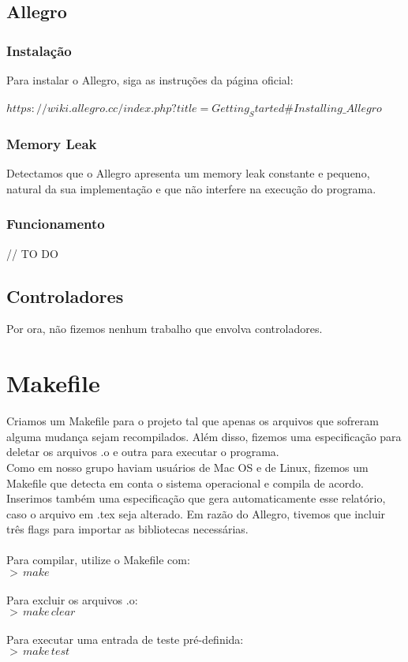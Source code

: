 \documentclass{article}
\begin{document}
\subsection{Allegro}
\subsubsection{Instalação}
Para instalar o Allegro, siga as instruções da página oficial: \\ \\
    $https://wiki.allegro.cc/index.php?title=Getting_Started\#Installing\_Allegro$

\subsubsection{Memory Leak}
Detectamos que o Allegro apresenta um memory leak constante e pequeno, natural da sua implementação e que não interfere na execução do programa.

\subsubsection{Funcionamento}
// TO DO


\subsection{Controladores}
Por ora, não fizemos nenhum trabalho que envolva controladores.

\section{Makefile}
Criamos um Makefile para o projeto tal que apenas os arquivos que sofreram alguma mudança sejam recompilados. Além disso, fizemos uma especificação para deletar os arquivos .o e outra para executar o programa. \\
Como em nosso grupo haviam usuários de Mac OS e de Linux, fizemos um Makefile que detecta em conta o sistema operacional e compila de acordo.
Inserimos também uma especificação que gera automaticamente esse relatório, caso o arquivo em .tex seja alterado.
Em razão do Allegro, tivemos que incluir três flags para importar as bibliotecas necessárias. \\ \\
Para compilar, utilize o Makefile com:
\\
\indent $>\,make$ \\ \\
Para excluir os arquivos .o:
\\
\indent $>\,make\,clear$ \\ \\
Para executar uma entrada de teste pré-definida:
\\
\indent $>\,make\,test$
\end{document}
